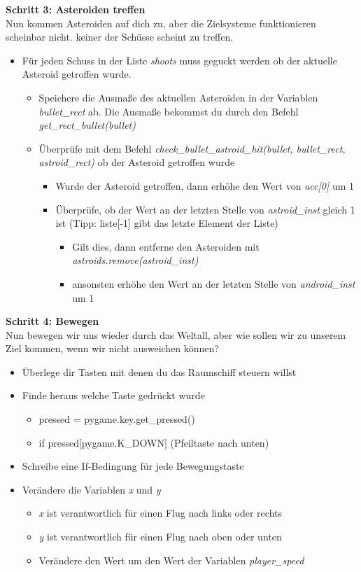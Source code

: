 \textbf{Schritt 3: Asteroiden treffen}\\
Nun kommen Asteroiden auf dich zu, aber die Zielsysteme funktionieren scheinbar nicht. keiner der Schüsse scheint zu treffen.
\begin{itemize}
	\item Für jeden Schuss in der Liste \textit{shoots} muss geguckt werden ob der aktuelle Asteroid getroffen wurde.
	\begin{itemize}
		\item Speichere die Ausmaße des aktuellen Asteroiden in der Variablen \textit{bullet\_rect} ab. Die Ausmaße bekommst du durch den Befehl \textit{get\_rect\_bullet(bullet)}
		\item Überprüfe mit dem Befehl \textit{check\_bullet\_astroid\_hit(bullet, bullet\_rect, astroid\_rect)} ob der Asteroid getroffen wurde
		\begin{itemize}
			\item Wurde der Asteroid getroffen, dann erhöhe den Wert von \textit{acc[0]} um 1
			\item Überprüfe, ob der Wert an der letzten Stelle von \textit{astroid\_inst} gleich 1 ist (Tipp: liste[-1] gibt das letzte Element der Liste)
			\begin{itemize}
				\item Gilt dies, dann entferne den Asteroiden mit \textit{astroids.remove(astroid\_inst)}
				\item ansonsten erhöhe den Wert an der letzten Stelle von \textit{android\_inst} um 1
			\end{itemize}
		\end{itemize}
	\end{itemize}
\end{itemize}
\textbf{Schritt 4: Bewegen}\\
Nun bewegen wir uns wieder durch das Weltall, aber wie sollen wir zu unserem Ziel kommen, wenn wir nicht ausweichen können?
\begin{itemize}
	\item Überlege dir Tasten mit denen du das Raumschiff steuern willst
	\item Finde heraus welche Taste gedrückt wurde
	\begin{itemize}
		\item pressed = pygame.key.get\_pressed()
		\item if pressed[pygame.K\_DOWN] (Pfeiltaste nach unten)
	\end{itemize}
	\item Schreibe eine If-Bedingung für jede Bewegungstaste
	\item Verändere die Variablen \textit{x} und \textit{y}
	\begin{itemize}
		\item \textit{x} ist verantwortlich für einen Flug nach links oder rechts
		\item \textit{y} ist verantwortlich für einen Flug nach oben oder unten
		\item Verändere den Wert um den Wert der Variablen \textit{player\_speed}
	\end{itemize}	 
\end{itemize}